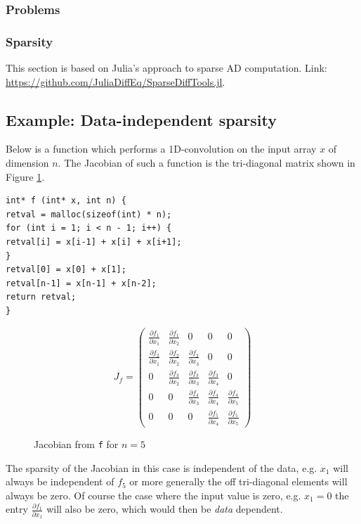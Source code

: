 \subsubsection{Problems}
\subsubsection{Sparsity}
This section is based on Julia's approach to sparse AD computation. 
Link: \url{https://github.com/JuliaDiffEq/SparseDiffTools.jl}. 


\subsection{Example: Data-independent sparsity}

Below is a function which performs a 1D-convolution on the input array $x$ of dimension $n$. 
The Jacobian of such a function is the tri-diagonal matrix shown in Figure \ref{fig:tridiag}. 
\begin{verbatim}
int* f (int* x, int n) {
retval = malloc(sizeof(int) * n);
for (int i = 1; i < n - 1; i++) {
retval[i] = x[i-1] + x[i] + x[i+1];
}
retval[0] = x[0] + x[1];
retval[n-1] = x[n-1] + x[n-2];
return retval;
}
\end{verbatim}
\begin{figure}[H]
	$$ J_{f} = \left(\begin{matrix}
	\frac{\partial f_1}{\partial x_1} & \frac{\partial f_1}{\partial x_2} & 0 & 0 & 0 \\
	\frac{\partial f_2}{\partial x_1}& \frac{\partial f_2}{\partial x_2} & \frac{\partial f_2}{\partial x_3} & 0 & 0\\
	0 & \frac{\partial f_3}{\partial x_2} & \frac{\partial f_3}{\partial x_3} & \frac{\partial f_3}{\partial x_4} & 0\\
	0 & 0 & \frac{\partial f_4}{\partial x_3} & \frac{\partial f_4}{\partial x_4} & \frac{\partial f_4}{\partial x_5} \\
	0 & 0 & 0 & \frac{\partial f_5}{\partial x_4} & \frac{\partial f_5}{\partial x_5}
	\end{matrix}\right) $$
	\caption{Jacobian from \texttt{f} for $n=5$}
	\label{fig:tridiag}
\end{figure}
The sparsity of the Jacobian in this case is independent of the data, e.g. $x_1$ will always be independent of $f_5$ 
or more generally the off tri-diagonal elements will always be zero. 
Of course the case where the input value is zero, e.g. $x_1 = 0$  the entry $\frac{\partial f_1}{\partial x_1}$ will also be zero, 
which would then be \emph{data} dependent.

